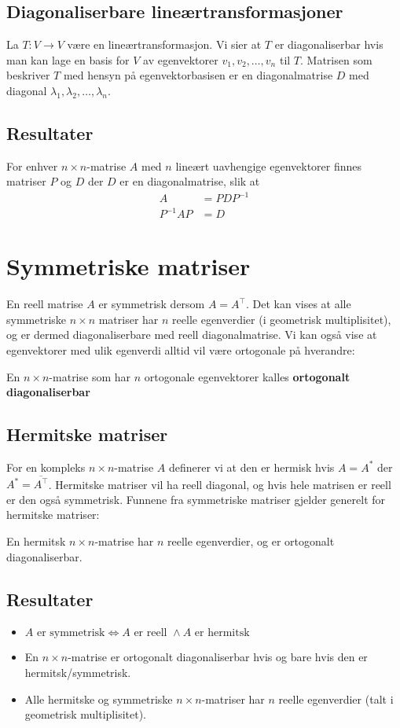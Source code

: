 \documentclass[12pt,a4paper,norsk]{article}
\begin{document}
\subsection{Diagonaliserbare lineærtransformasjoner}
La $T:V\rightarrow V$ være en lineærtransformasjon. Vi sier at $T$ er diagonaliserbar hvis
man kan lage en basis for $V$ av egenvektorer $v_{1}, v_{2}, \ldots, v_{n}$ til $T$.
Matrisen som beskriver $T$ med hensyn på egenvektorbasisen er en diagonalmatrise
$D$ med diagonal $\lambda_{1}, \lambda_{2}, \ldots, \lambda_{n}$.

\subsection{Resultater}
For enhver $n\times n$-matrise $A$ med $n$ lineært uavhengige egenvektorer finnes
matriser $P$ og $D$ der $D$ er en diagonalmatrise, slik at
\begin{align*}
  A &= PDP^{-1} \\
  P^{-1}AP &= D
\end{align*}

\section{Symmetriske matriser}\label{sec:symmetriske_matriser}
En reell matrise $A$ er symmetrisk dersom $A = A^{\top}$. Det kan vises at
alle symmetriske $n \times n$ matriser har $n$ reelle egenverdier (i geometrisk
multiplisitet), og er dermed diagonaliserbare med reell diagonalmatrise. Vi kan
også vise at egenvektorer med ulik egenverdi alltid vil være ortogonale på
hverandre:

En $n \times n$-matrise som har $n$ ortogonale egenvektorer kalles \textbf{ortogonalt
diagonaliserbar}

\subsection{Hermitske matriser}
For en kompleks $n \times n$-matrise $A$ definerer vi at den er hermisk hvis $A = A^{*}$
der $A^{*} = \overline{A^{\top}}$. Hermitske matriser vil ha reell diagonal, og hvis
hele matrisen er reell er den også symmetrisk. Funnene fra symmetriske matriser
gjelder generelt for hermitske matriser:

En hermitsk $n \times n$-matrise har $n$ reelle egenverdier, og er ortogonalt diagonaliserbar.

\subsection{Resultater}
\begin{itemize}
\item $A\text{ er symmetrisk} \iff A\text{ er reell } \wedge A\text{ er hermitsk}$
\item En $n \times n$-matrise er ortogonalt diagonaliserbar hvis og bare hvis
  den er hermitsk/symmetrisk.
\item Alle hermitske og symmetriske $n \times n$-matriser har $n$ reelle
  egenverdier (talt i geometrisk multiplisitet).
\end{itemize}
\end{document}
